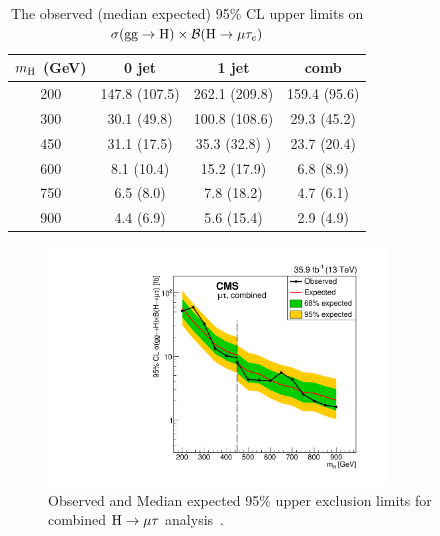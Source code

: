 \begin{table}
\caption{The observed (median expected) 95\% CL upper limits on $\sigma(\textrm{gg}\rightarrow \text{H}) \times\mathcal{B}(\text{H} \to \mu \tau_{e})$}
\begin{center}
\begin{tabular}{c|c|c|c}
\hline
$m_{\text{H}}$ (GeV) & 0 jet & 1 jet  & comb\\
\hline
200 &147.8 (107.5) & 262.1 (209.8)& 159.4 (95.6) \\
300 &30.1 (49.8) & 100.8 (108.6) & 29.3 (45.2) \\
450 &31.1 (17.5) & 35.3 (32.8) )& 23.7 (20.4) \\
600 &8.1 (10.4)& 15.2 (17.9)& 6.8 (8.9) \\
750 &6.5 (8.0)& 7.8 (18.2)& 4.7 (6.1) \\
900 &4.4 (6.9)& 5.6 (15.4)& 2.9 (4.9) \\
\hline
\end{tabular}
\label{table:limits_Hmue}
\end{center}
\end{table}


\begin{figure}[!htpb]
  \centering
   \captionsetup{width=.8\textwidth,justification=centering}
 \includegraphics[width=0.8\textwidth]{plots_and_figures/chapter8/highmass/Figure_005-c.pdf}
\caption{Observed and Median expected 95\% upper exclusion limits for combined $\text{H} \to \mu \tau$ analysis~\cite{HIG-18-017}.}
 \label{fig:limits_Hmu}
\end{figure}



%
% 
% 
